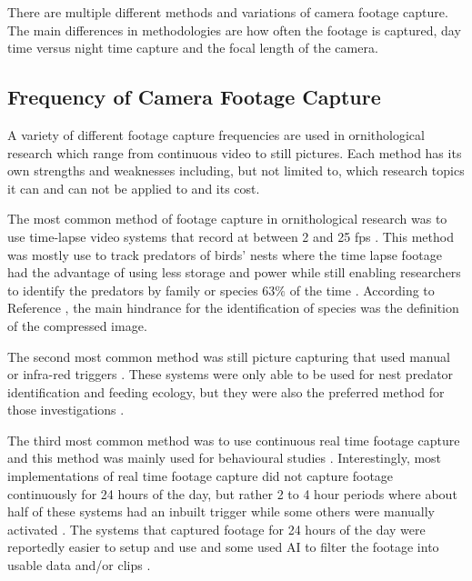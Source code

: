 \documentclass[class=report,11pt,crop=false]{standalone}
\begin{document}
There are multiple different methods and variations of camera footage capture. The main differences in methodologies are how often the footage is captured, day time versus night time capture and the focal length of the camera.

\subsection{Frequency of Camera Footage Capture}

A variety of different footage capture frequencies are used in ornithological research which range from continuous video to still pictures. Each method has its own strengths and weaknesses including, but not limited to, which research topics it can and can not be applied to and its cost.

The most common method of footage capture in ornithological research was to use time-lapse video systems that record at between 2 and 25 \acrfull{fps} \cite{CAMDevelopmentOfNestMonitoring}. This method was mostly use to track predators of birds' nests \cite{CAMDevelopmentOfNestMonitoring} where the time lapse footage had the advantage of using less storage and power while still enabling researchers to identify the predators by family or species $63\%$ of the time \cite{CAMTimeLapsePredators}. According to Reference \cite{CAMTimeLapsePredators}, the main hindrance for the identification of species was the definition of the compressed image. 

The second most common method was still picture capturing that used manual or infra-red triggers \cite{CAMDevelopmentOfNestMonitoring} \cite{CAMBirdCollisions}. These systems were only able to be used for nest predator identification and feeding ecology, but they were also the preferred method for those investigations \cite{CAMDevelopmentOfNestMonitoring} \cite{CAMRemoteWildlifePhotography}. 

The third most common method was to use continuous real time footage capture and this method was mainly used for behavioural studies \cite{CAMDevelopmentOfNestMonitoring}. Interestingly, most implementations of real time footage capture did not capture footage continuously for 24 hours of the day, but rather 2 to 4 hour periods where about half of these systems had an inbuilt trigger  while some others were manually activated \cite{CAMDevelopmentOfNestMonitoring}. The systems that  captured footage for 24 hours of the day were reportedly easier to setup and use \cite{CAMDVR24hr} and some used \acrlong{AI} to filter the footage into usable data and/or clips \cite{CAMAIModels}.
\end{document}
